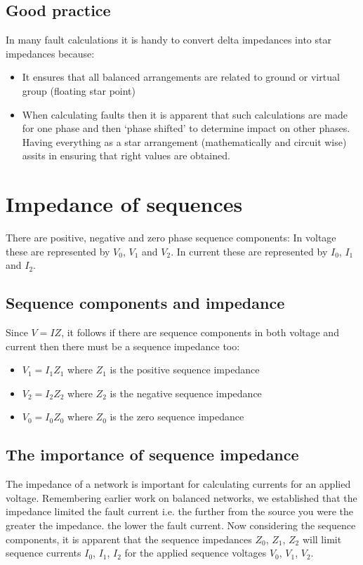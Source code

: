 \subsection{Good practice}
In many fault calculations it is handy to convert delta impedances into star impedances because:
\begin{itemize}
	\item It ensures that all balanced arrangements are related to ground or virtual group (floating star point)
	\item When calculating faults then it is apparent that such calculations are made for one phase and then `phase shifted' to determine impact on other phases. Having everything as a star arrangement (mathematically and circuit wise) assits in ensuring that right values are obtained.
\end{itemize}
\section{Impedance of sequences}
There are positive, negative and zero phase sequence components: In voltage these are represented by $V_0$, $V_1$ and $V_2$. In current these are represented by $I_0$, $I_1$ and $I_2$.
\subsection{Sequence components and impedance}
Since $V=IZ$, it follows if there are sequence components in both voltage and current then there must be a sequence impedance too:
\begin{itemize}
	\item $V_1 = I_1 Z_1$ where $Z_1$ is the positive sequence impedance
	\item $V_2 = I_2 Z_2$ where $Z_2$ is the negative sequence impedance
	\item $V_0 = I_0 Z_0$ where $Z_0$ is the zero sequence impedance
\end{itemize}
\subsection{The importance of sequence impedance}
The impedance of a network is important for calculating currents for an applied voltage. Remembering earlier work on balanced networks, we established that the impedance limited the fault current i.e. the further from the source you were the greater the impedance. the lower the fault current. Now considering the sequence components, it is apparent that the sequence impedances $Z_0$, $Z_1$, $Z_2$ will limit sequence currents $I_0$, $I_1$, $I_2$ for the applied sequence voltages $V_0$, $V_1$, $V_2$.
